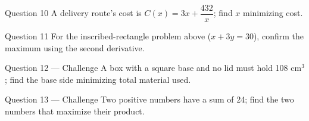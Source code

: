 \documentclass[11pt]{article}
\begin{document}
\begin{qbox}{Question 10}
A delivery route's cost is $C(x)=3x+\dfrac{432}x$; find $x$ minimizing cost.\workspace{2.4cm}
\end{qbox}

\begin{qbox}{Question 11}
For the inscribed-rectangle problem above ($x+3y=30$), confirm the maximum using the second derivative.\workspace{2.4cm}
\end{qbox}

\begin{qbox}{Question 12 --- Challenge}
A box with a square base and no lid must hold 108 cm$^3$; find the base side minimizing total material used.\workspace{3.4cm}
\end{qbox}

\begin{qbox}{Question 13 --- Challenge}
Two positive numbers have a sum of 24; find the two numbers that maximize their product.\workspace{3cm}
\end{qbox}

\clearpage
{}
\end{document}
